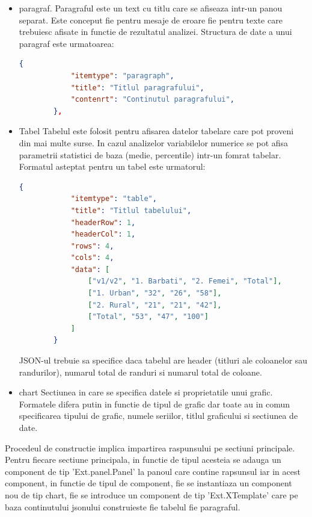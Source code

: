 \begin{itemize}

\item paragraf. Paragraful este un text cu titlu care se afiseaza intr-un panou separat. Este conceput fie pentru mesaje de eroare fie pentru texte care trebuiesc afisate in functie de rezultatul analizei. Structura de date a unui paragraf este urmatoarea: 

\begin{lstlisting}[language=json]
		{
            "itemtype": "paragraph",
            "title": "Titlul paragrafului",
            "contenrt": "Continutul paragrafului",
        },
\end{lstlisting}

\item Tabel Tabelul este folosit pentru afisarea datelor tabelare care pot proveni din mai multe surse. In cazul analizelor variabilelor numerice se pot afisa parametrii statistici de baza (medie, percentile) intr-un fomrat tabelar. Formatul asteptat pentru un tabel este urmatorul: 

\begin{lstlisting}[language=json]
       {
            "itemtype": "table",
            "title": "Titlul tabelului",
            "headerRow": 1,
            "headerCol": 1,
            "rows": 4,
            "cols": 4,
            "data": [
                ["v1/v2", "1. Barbati", "2. Femei", "Total"],
                ["1. Urban", "32", "26", "58"],
                ["2. Rural", "21", "21", "42"],
                ["Total", "53", "47", "100"]
            ]
        }
\end{lstlisting}

JSON-ul trebuie sa specifice daca tabelul are header (titluri ale coloanelor sau randurilor), numarul total de randuri si numarul total de coloane. 


\item chart Sectiunea in care se specifica datele si proprietatile unui grafic. Formatele difera putin in functie de tipul de grafic dar toate au in comun specificarea tipului de grafic, numele seriilor, titlul graficului si sectiunea de date. 


\end{itemize}

Procedeul de constructie implica impartirea raspunsului pe sectiuni principale. Pentru fiecare sectiune principala, in functie de tipul acesteia se adauga un component de tip 'Ext.panel.Panel' la panoul care contine rapsunsul iar in acest component, in functie de tipul de component, fie se instantiaza un component nou de tip chart, fie se introduce un component de tip 'Ext.XTemplate' care pe baza continutului jsonului construieste fie tabelul fie paragraful. 




